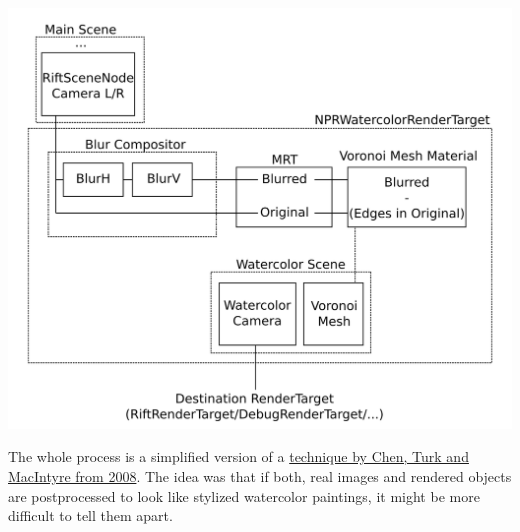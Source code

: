 \includegraphics*[width=.92\textwidth]{NPRWatercolorRenderTarget.png}

The whole process is a simplified version of a
\href{http://csnotes.upm.edu.my/kelasmaya/web.nsf/0/d82e709c4661ce464825766400365c4d/$FILE/p231-chen.pdf}{technique
by Chen, Turk and MacIntyre from 2008}\cite{watercolor}. The idea was that if both, real
images and rendered objects are postprocessed to look like stylized
watercolor paintings, it might be more difficult to tell them apart.